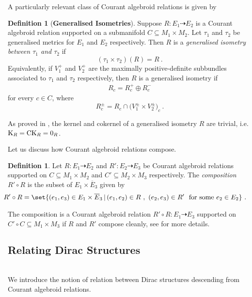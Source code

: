 \documentclass[a4paper, reqno, 11pt]{amsart}
\numberwithin{equation}{section}
\theoremstyle{definition}
\newtheorem{definition}[equation]{Definition}
\newcommand{\rel}{\dashrightarrow}
\theoremstyle{remark}
\begin{document}
A particularly relevant class of Courant algebroid relations is given by

\begin{definition}[\textbf{Generalised Isometries}]\label{defn:generalisedisometry}
Suppose $R\colon E_1 \rel E_2$ is a Courant algebroid relation supported on a submanifold $C\subseteq M_1 \times M_2$. Let $\tau_1$ and $\tau_2$ be generalised metrics for $E_1$ and $E_2$ respectively. Then $R$ is a \emph{generalised isometry between $\tau_1$ and $\tau_2$} if $$(\tau_1\times\tau_2) (R) = R \ . $$ Equivalently, if $V_1^+$ and $ V_2^+$ are the maximally positive-definite subbundles associated to $\tau_1$ and $\tau_2$ respectively, then $R$ is a generalised isometry if
\begin{align}
    R_c = R_c^+ \oplus R^-_c
\end{align}
for every $c\in C$, where $$R_c^\pm = R_c \cap\big(V_1^\pm \times V_2^\pm\big)_c \ . $$
\end{definition}

As proved in \cite[Proposition 4.17]{DeFraja:2023fhe}, the kernel and cokernel of a generalised isometry $R$ are trivial, i.e. $ {\rm K}_R = {\rm CK}_R = {0_R}$.

Let us discuss how Courant algebroid relations compose.

\begin{definition}
Let $R\colon E_1 \rel E_2$ and $R' \colon  E_2 \rel E_3$ be Courant algebroid relations supported on $C\subseteq M_1\times M_2$ and $C'\subseteq M_2\times M_3$ respectively. The \emph{composition} $R' \circ R$ is the subset of $E_1 \times \overline{E}_3$ given by
\begin{align}\label{eqn:reldefinition}
\hspace{-5mm} R'\circ R = \set{(e_1,e_3) \in E_1 \times \overline{E}_3 \, | \, (e_1, e_2) \in R \ , \ (e_2,e_3) \in R' \ \text{ for some } e_2\in E_2} \ .
\end{align}
\end{definition}

The composition is a Courant algebroid relation $R' \circ R:E_1\rel E_3$ supported on $C'\circ C\subseteq M_1\times M_3$ if $R$ and $R'$ {compose cleanly}, see \cite{Vysoky2020hitchiker,DeFraja:2023fhe} for more details. 

\medskip

\subsection{Relating Dirac Structures}~\\[5pt]    
We introduce the notion of relation between Dirac structures descending from Courant algebroid relations.
\end{document}
